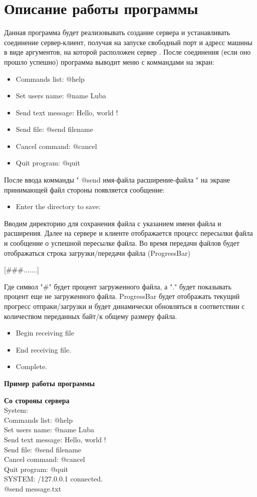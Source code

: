 \documentclass[12pt,a4paper]{article}
\begin{document}
\section*{Описание работы программы}

Данная программа будет реализовывать создание сервера и  устанавливать соединение сервер-клиент, получая на запуске   свободный порт и адресс машины в виде аргументов, на которой расположен сервер . После соединения (если оно прошло успешно) программа выводит меню с коммандами на экран:
\begin{itemize}
\item Commands list: @help
\item Set users name: @name Luba
\item Send text message: Hello, world !
\item Send file: @send filename
\item Cancel command: @cancel
\item Quit program: @quit
\end{itemize}
После ввода комманды " @send имя-файла расширение-файла " на экране принимающей файл стороны появляется сообщение:
\begin{itemize}
\item Enter the directory to save:
\end{itemize}
Вводим директорию для сохранения файла с указанием имени файла и
расширения. Далее на сервере и клиенте отображается процесс пересылки
файла и сообщение о успешной пересылке файла. Во время передачи файлов будет отображаться строка загрузки/передачи файла
(ProgressBar)

 [\#\#\#.......]
 
 Где символ "\#" будет процент загруженного файла, а "." будет показывать процент еще не загруженного файла. ProgressBar будет отображать текущий прогресс отпраки/загрузки и будет динамически обновляться в соответствии с количеством переданных байт/к общему размеру файла.

\begin{itemize}
\item Begin receiving file
\item End receiving file.
\item Complete.
\end{itemize}

\newpage
\begin{center}
\Large{\bf Пример работы программы }
\end{center}

\Large{\bf Со стороны сервера }
\\System:
\\Commands list: @help
\\Set users name: @name Luba
\\Send text message: Hello, world !
\\Send file: @send filename
\\Cancel command: @cancel
\\Quit program: @quit
\\SYSTEM: /127.0.0.1 connected.
\\@send message.txt
\\
\\[\#\#\#\#\#.......]
\end{document}
